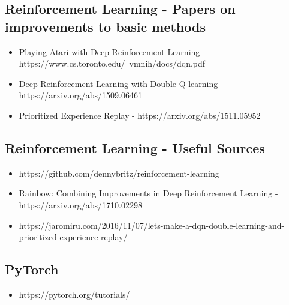 \documentclass{article}
\begin{document}
\subsection{Reinforcement Learning - Papers on improvements to basic methods}
\begin{itemize}
\item Playing Atari with Deep Reinforcement Learning - https://www.cs.toronto.edu/~vmnih/docs/dqn.pdf
\item 
Deep Reinforcement Learning with Double Q-learning - https://arxiv.org/abs/1509.06461
\item Prioritized Experience Replay - https://arxiv.org/abs/1511.05952
\end{itemize}
\subsection{Reinforcement Learning - Useful Sources}
\begin{itemize}
\item https://github.com/dennybritz/reinforcement-learning
\item  Rainbow: Combining Improvements in Deep Reinforcement Learning - https://arxiv.org/abs/1710.02298
\item https://jaromiru.com/2016/11/07/lets-make-a-dqn-double-learning-and-prioritized-experience-replay/
\end{itemize}
\subsection{PyTorch}
\begin{itemize}
\item https://pytorch.org/tutorials/
\end{itemize}
\end{document}
